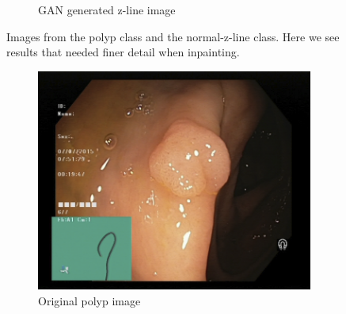 \begin{figure}
\begin{subfigure}[t]{\myfigsizethree}
            \caption{GAN generated z-line image}    
            \label{fig:z_GAN_SQUARE1}
        \end{subfigure}
        \caption{Images from the polyp class and the normal-z-line class. Here we see results that needed finer detail when inpainting.} 
        \label{fig:AE_GAN_SQUARE1}
\end{figure}  
\begin{figure}
                \tiny
        \begin{subfigure}[t]{\myfigsizethree}
            \centering
            \includegraphics[height=\textwidth ,width=\textwidth]{experiments/figures/greensquare/normalmissORIG.png}
            \caption{Original polyp image}   
            \label{fig:polyp_ORIG_SQUARE2}
        \end{subfigure}
        \qquad
        \begin{subfigure}[t]{\myfigsizethree}
            \centering

\end{subfigure}
\end{figure}
